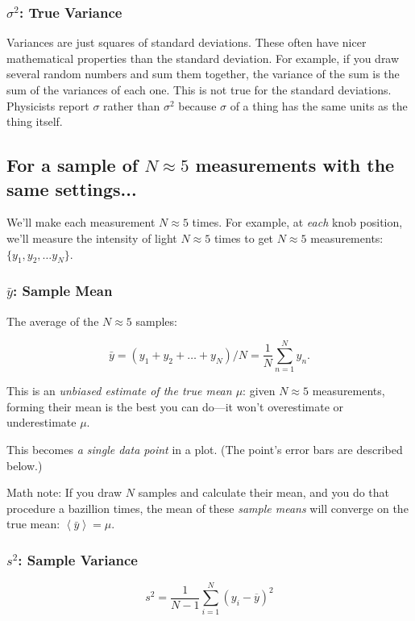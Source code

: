\documentclass[12pt]{article}
\begin{document}
\subsubsection*{$\sigma^2$: True Variance} Variances are just squares of standard deviations. These often have nicer mathematical properties than the standard deviation. For example, if you draw several random numbers and sum them together, the variance of the sum is the sum of the variances of each one. This is not true for the standard deviations.  Physicists report $\sigma$ rather than $\sigma^2$ because $\sigma$ of a thing has the same units as the thing itself.


\pagebreak

\subsection*{For a sample of $N\approx5$ measurements with the same settings...}

We'll make each measurement $N\approx5$ times. For example, at \textit{each} knob position, we'll measure the intensity of light $N\approx5$ times to get $N\approx5$ measurements: $\{y_1, y_2, \dots y_N\}$. 

\subsubsection*{$\bar y$: Sample Mean} The average of the $N\approx5$ samples:

\[
\bar y 
= \left( y_1 + y_2 + \dots + y_N \right)/N 
= \frac{1}{N} \sum_{n=1}^N y_n .
\]

This is an \textit{unbiased estimate of the true mean $\mu$}: given $N\approx5$ measurements, forming their mean is the best you can do---it won't overestimate or underestimate $\mu$. 

This becomes \textit{a single data point} in a plot. (The point's error bars are described below.)

Math note: If you draw $N$ samples and calculate their mean, and you do that procedure a bazillion times, the mean of these \textit{sample means} will converge on the true mean: $\left< \bar y \right> = \mu$.

\subsubsection*{$s^2$: Sample Variance} 
\vspace{-1em}
\[
s^2 = \frac{1}{N-1} \sum_{i=1}^N (y_i - \overline{y})^2
\]
\end{document}
